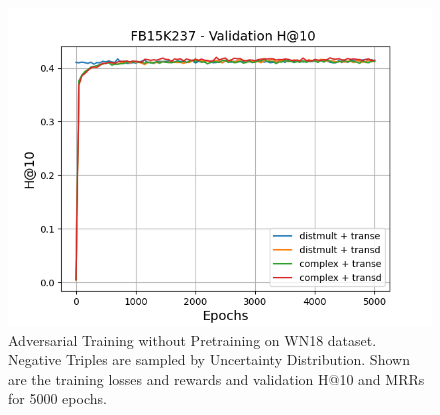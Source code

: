\begin{figure}
\begin{minipage}{.5\textwidth}
    \end{minipage}%
    \begin{minipage}{.5\textwidth}
      \centering
      \includegraphics[width=0.9\linewidth]{figures/results/gan_train/not_pretrained/uncertainty/max_distribution/entropy/fb15k237/gan_train_uncertainty_fb15k237_hit10s.png}
    \end{minipage}%
    \caption{Adversarial Training without Pretraining on \textsc{WN18} dataset. 
    Negative Triples are sampled by Uncertainty Distribution.
    Shown are the training losses and rewards and validation H@10 and MRRs for 5000 epochs.}
    \label{fig:advtrain_not_pretrained_fb15k237_pretrained}
\end{figure}






